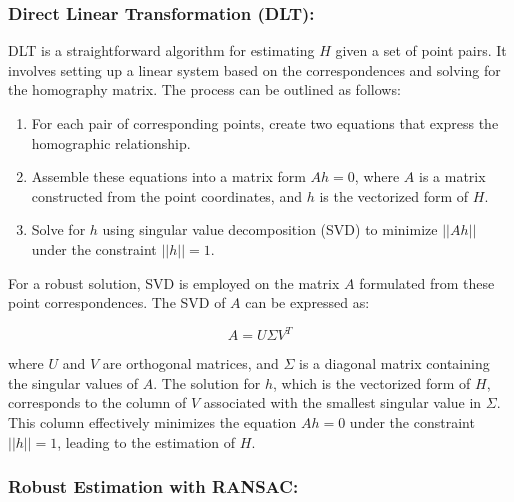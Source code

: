 \documentclass[12pt, letterpaper]{article}
\begin{document}
{\begin{spacing}{1.2}
\subsubsection{Direct Linear Transformation (DLT):}
DLT is a straightforward algorithm for estimating \(H\) given a set of point pairs. It involves setting up a linear system based on the correspondences and solving for the homography matrix. The process can be outlined as follows:
\begin{enumerate}
    \item For each pair of corresponding points, create two equations that express the homographic relationship.
    \item Assemble these equations into a matrix form \(Ah = 0\), where \(A\) is a matrix constructed from the point coordinates, and \(h\) is the vectorized form of \(H\).
    \item Solve for \(h\) using singular value decomposition (SVD) to minimize \(||Ah||\) under the constraint \(||h||=1\).
\end{enumerate}

For a robust solution, SVD is employed on the matrix \(A\) formulated from these point correspondences. The SVD of \(A\) can be expressed as:

\begin{equation}
    A = U \Sigma V^T
\end{equation}

where \(U\) and \(V\) are orthogonal matrices, and \(\Sigma\) is a diagonal matrix containing the singular values of \(A\). The solution for \(h\), which is the vectorized form of \(H\), corresponds to the column of \(V\) associated with the smallest singular value in \(\Sigma\). This column effectively minimizes the equation \(Ah = 0\) under the constraint \(||h|| = 1\), leading to the estimation of \(H\).


\subsubsection{Robust Estimation with RANSAC:}


\end{spacing}}
\end{document}
